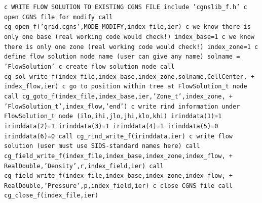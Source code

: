 \documentclass[12pt]{article}
\begin{document}
{\tt \noindent c  WRITE FLOW SOLUTION TO EXISTING CGNS FILE
\newline\indent      include 'cgnslib\_f.h'
\newline c  open CGNS file for modify
\newline\indent      call cg\_open\_f('grid.cgns',MODE\_MODIFY,index\_file,ier)
\newline c  we know there is only one base (real working code would check!)
\newline\indent      index\_base=1
\newline c  we know there is only one zone (real working code would check!)
\newline\indent      index\_zone=1
\newline c  define flow solution node name (user can give any name)
\newline\indent      solname = 'FlowSolution'
\newline c  create flow solution node
\newline\indent      call cg\_sol\_write\_f(index\_file,index\_base,index\_zone,solname,CellCenter,
\newline + \indent index\_flow,ier)
\newline c  go to position within tree at FlowSolution\_t node
\newline\indent      call cg\_goto\_f(index\_file,index\_base,ier,'Zone\_t',index\_zone,
\newline + \indent 'FlowSolution\_t',index\_flow,'end')
\newline c   write rind information under FlowSolution\_t node (ilo,ihi,jlo,jhi,klo,khi)
\newline\indent      irinddata(1)=1
\newline\indent      irinddata(2)=1
\newline\indent      irinddata(3)=1
\newline\indent      irinddata(4)=1
\newline\indent      irinddata(5)=0
\newline\indent      irinddata(6)=0
\newline\indent      call cg\_rind\_write\_f(irinddata,ier)
\newline c  write flow solution (user must use SIDS-standard names here)
\newline\indent      call cg\_field\_write\_f(index\_file,index\_base,index\_zone,index\_flow,
\newline + \indent RealDouble,'Density',r,index\_field,ier)
\newline\indent      call cg\_field\_write\_f(index\_file,index\_base,index\_zone,index\_flow,
\newline + \indent RealDouble,'Pressure',p,index\_field,ier)
\newline c  close CGNS file
\newline\indent      call cg\_close\_f(index\_file,ier)}
\end{document}
